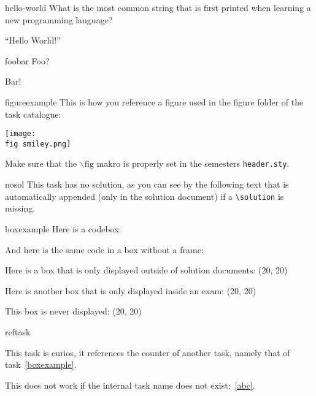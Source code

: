 
\begin{task}{hello-world}
What is the most common string that is first printed when learning a new programming language?
    
\solution

``Hello World!''
\end{task}



\begin{task}{foobar}
Foo?
    
\solution

Bar!
\end{task}



\begin{task}{figureexample}
This is how you reference a figure used in the figure folder of the task catalogue:

\centerline{\texttt{[image: \\fig smiley.png]}}

Make sure that the $\backslash \text{fig}$ makro is properly set in the semesters \verb!header.sty!.
\end{task}



\begin{task}{nosol}
This task has no solution, as you can see by the following text that is automatically 
appended (only in the solution document) if a \verb!\solution! is missing.
\end{task}



\begin{task}{boxexample}
\lstset{language=Python}
Here is a codebox:


And here is the same code in a box without a frame:


Here is a box that is only displayed outside of solution documents: \Box(20, 20)

Here is another box that is only displayed inside an exam: \KBox(20, 20)

\solution

This box is never displayed: \Box(20, 20)

\end{task}



\begin{task}{reftask}

This task is curios, it references the counter of another task, namely that of
task~\ref{boxexample}.

\solution

This does not work if the internal task name does not exist:~\ref{abc}.

\end{task}